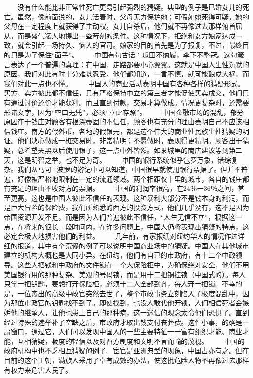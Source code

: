 \documentclass[12pt,oneside]{book}
\begin{document}
\begin{common-format}
　　没有什么能比非正常性死亡更易引起强烈的猜疑。典型的例子是已婚女儿的死亡。虽然，像前面说的，女儿活着时，父母无力保护她；可假如她死得可疑，她的父母在一定程度上就获得了主动权。女儿自杀后，他们就不再像过去那样俯首屈从，而是盛气凌人地提出一些苛刻的条件。这种情况下，拒绝和女方娘家达成一致，就会引起一场持久、恼人的官司。娘家的目的首先是为了报复，不过，最终目的只是为了保住“面子”。 
　　中国有句古话：瓜田不纳履，李下不整冠。这句箴言表达了一个普遍的真理：在中国，走路都要小心翼翼。这就是中国人生性沉默的原因，我们对此有时十分难以忍受。他们都知道，一言不慎，就可能酿成大祸，而我们对此一点也不懂。 
　　中国人的商业活动表明中国有各种各样的猜疑形式。买方、卖方彼此都不信任，只有严格保持中立的第三者才能促使买卖成交，他们只有通过讨价还价才能获利。而且直到付款，交易才算做成。情况更复杂时，还需要形诸文字，因为“空口无凭”，必须“立此存照”。 
　　中国金融市场的混乱，部分原因在于钱庄对顾客有根深蒂固的不信任，顾客也有充分的理由表明自己不应该相信钱庄。南方的假外币，各地的假银元，都是这个伟大的商业性民族生性猜疑的明证。他们决心做成一桩交易时，非常精明；不愿做时，表现得更精明。顾客出于猜疑，总希望天黑以后使用银子，这一点中外皆然。如果城里的商店建议等到第二天，这是明智之举，也不足为奇。 
　　中国的银行系统似乎包罗万象，错综复杂。我们从马可·波罗的游记中可以知道，中国很早就使用银行票据了。但并不普遍，好像被严格地限制在一定的流通领域。两个相距仅十里的城市，各自的钱庄都有充足的理由不收对方的票据。 
　　中国的利润率很高，在24％一36％之间，甚至更高，这也是中国人彼此不信任的表现。这种暴利大部分不是钱本身的利润，而是巨大冒险的保险费，我们所熟悉的西方的投资方式，他们几乎没有，这不是因为帝国资源开发不足，而是因为人们普遍彼此不信任，“人生无信不立”，根据这一点，在将来的很长一段时间内，在许多问题上，中国人仍将表现出猜疑的特点，这必定会极大地损害他们的利益。 
　　几年前，有家报纸对纽约华人的情况作过详细的报道，其中有个荒谬的例子可以说明中国商业场中的猜疑。中国人在其他城市建立的机构大概也是大同小异。在纽约，他们有自已的市政府，有十二个中政领导。这些人把钱和中政府的文件锁在一个大保险柜中，为确保绝对安全，他们不用美国银行用的那种复杂、美观的号码锁，而是用十二把铜挂锁（中国式的）。每人只掌一把钥匙，要想打开保险柜，必须十二人全部到齐，每人开一把锁。不幸的是，一位杰出的高级中政官突然去世了，整个市政事务立刻陷入了极度混乱中，因为那位市政官的钥匙找不到了。即使找到，也没人敢代他开锁，人们相信死者会嫉妒他的继承人，让他也患上自己的那种病，这一迷信的观念太令他们恐惧了。直到经过特殊的选举补了空缺之后，市政府才取出钱支付丧葬费。这件小事，的确是一扇窗口，通过它，人们可以发现中国人的一些主要特征一一富有组织才能、商业才能，互相猜疑，极度的轻信以及对西方制度和文明不言而喻的蔑视。 
　　中国的政府机构中也不乏相互猜疑的例子。宦官是亚洲典型的现象，中国古亦有之。但在目前的这个王朝，满族人采用了卓有成效的办法，使这批危险人物不再像过去那样有权力来危害人民了。 

\end{common-format}
\end{document}

